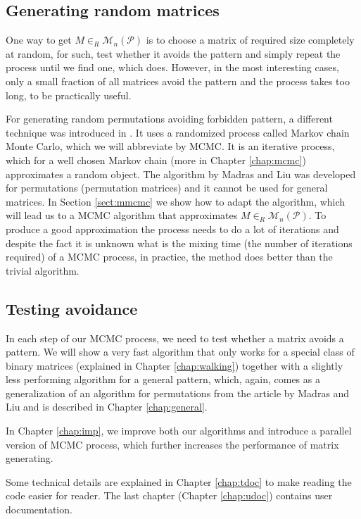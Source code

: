 \subsection*{Generating random matrices}
One way to get $M\in_R\mathcal{M}_n(\mathcal{P})$ is to choose a matrix of required size completely at random, for such, test whether it avoids the pattern and simply repeat the process until we find one, which does. However, in the most interesting cases, only a small fraction of all matrices avoid the pattern and the process takes too long, to be practically useful.

For generating random permutations avoiding forbidden pattern, a different technique was introduced in \cite{MadrasLiu-mcmc}. It uses a randomized process called Markov chain Monte Carlo, which we will abbreviate by MCMC. It is an iterative process, which for a well chosen Markov chain (more in Chapter \ref{chap:mcmc}) approximates a random object. The algorithm by Madras and Liu was developed for permutations (permutation matrices) and it cannot be used for general matrices. In Section \ref{sect:mmcmc} we show how to adapt the algorithm, which will lead us to a MCMC algorithm that approximates $M\in_R\mathcal{M}_n(\mathcal{P})$. To produce a good approximation the process needs to do a lot of iterations and despite the fact it is unknown what is the mixing time (the number of iterations required) of a MCMC process, in practice, the method does better than the trivial algorithm.
\subsection*{Testing avoidance}
In each step of our MCMC process, we need to test whether a matrix avoids a pattern. We will show a very fast algorithm that only works for a special class of binary matrices (explained in Chapter \ref{chap:walking}) together with a slightly less performing algorithm for a general pattern, which, again, comes as a generalization of an algorithm for permutations from the article by Madras and Liu and is described in Chapter \ref{chap:general}.

In Chapter \ref{chap:imp}, we improve both our algorithms and introduce a parallel version of MCMC process, which further increases the performance of matrix generating.

Some technical details are explained in Chapter \ref{chap:tdoc} to make reading the code easier for reader. The last chapter (Chapter \ref{chap:udoc}) contains user documentation.